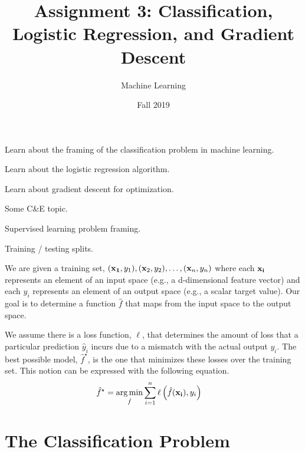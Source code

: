\documentclass[assignment03_Solutions]{subfiles}
\title{Assignment 3: Classification, Logistic Regression, and Gradient Descent}
\author{Machine Learning}
\date{Fall 2019}
\begin{document}
\maketitle
\thispagestyle{firstpage}


\begin{learningobjectives}
\bi
\item Learn about the framing of the classification problem in machine learning.
\item Learn about the logistic regression algorithm.
\item Learn about gradient descent for optimization.
\item Some C\&E topic.
\ei
\end{learningobjectives}

\begin{priorknowledge}
\bi
\item Supervised learning problem framing.
\item Training / testing splits.
\ei
\end{priorknowledge}
\vspace{1em}


\begin{recall}
We are given a training set, $(\mathbf{x_1}, y_1), (\mathbf{x}_2, y_2), \ldots, (\mathbf{x}_n, y_n)$ where each $\mathbf{x_i}$ represents an element of an input space (e.g., a d-dimensional feature vector) and each $y_i$ represents an element of an output space (e.g., a scalar target value).  Our goal is to determine a function $\hat{f}$ that maps from the input space to the output space.

We assume there is a loss function, $\ell$, that determines the amount of loss that a particular prediction $\hat{y}_i$ incurs due to a mismatch with the actual output $y_i$.  The best possible model, $\hat{f}^\star$, is the one that minimizes these losses over the training set.  This notion can be expressed with the following equation.
\begin{align}
\hat{f}^\star &= \operatorname*{arg\,min}_{\hat{f}} \sum_{i=1}^n \ell \left ( \hat{f}(\mathbf{x_i}), y_i \right )
\end{align} 
\end{recall}


\section{The Classification Problem}
\end{document}
